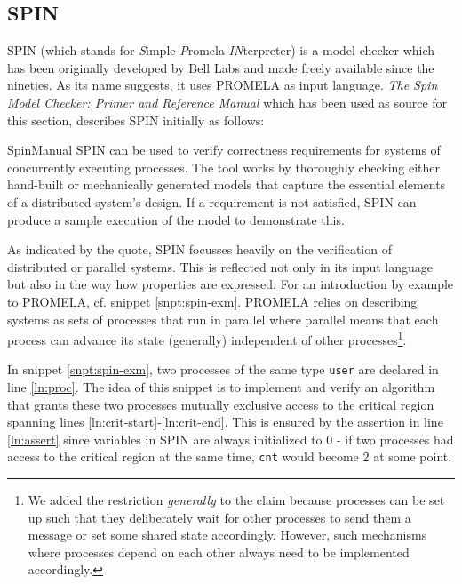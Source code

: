 \subsection{SPIN}
\label{sec:spin}

SPIN (which stands for \textit{S}imple \textit{P}romela \textit{IN}terpreter) is a model checker which has been originally developed by Bell Labs and made freely available since the nineties.
As its name suggests, it uses PROMELA as input language.
\textit{The Spin Model Checker: Primer and Reference Manual} which has been used as source for this section, describes SPIN initially as follows:
\begin{displaycquote}[p.1]{SpinManual}
    SPIN can be used to verify correctness requirements for systems of concurrently executing processes.
    The tool works by thoroughly checking either hand-built or mechanically generated models that capture the essential elements of a distributed system's design.
    If a requirement is not satisfied, SPIN can produce a sample execution of the model to demonstrate this.
\end{displaycquote}

As indicated by the quote, SPIN focusses heavily on the verification of distributed or parallel systems.
This is reflected not only in its input language but also in the way how properties are expressed.
For an introduction by example to PROMELA, cf. snippet \ref{snpt:spin-exm}.
PROMELA relies on describing systems as sets of processes that run in parallel where parallel means that each process can advance its state (generally) independent of other processes\footnote{%
    We added the restriction \textit{generally} to the claim because processes can be set up such that they deliberately wait for other processes to send them a message or set some shared state accordingly.
    However, such mechanisms where processes depend on each other always need to be implemented accordingly.
}.

In snippet \ref{snpt:spin-exm}, two processes of the same type \lstinline{user} are declared in line \ref{ln:proc}.
The idea of this snippet is to implement and verify an algorithm that grants these two processes mutually exclusive access to the critical region spanning lines \ref{ln:crit-start}-\ref{ln:crit-end}.
This is ensured by the assertion in line \ref{ln:assert} since variables in SPIN are always initialized to 0 - if two processes had access to the critical region at the same time, \lstinline{cnt} would become 2 at some point.

